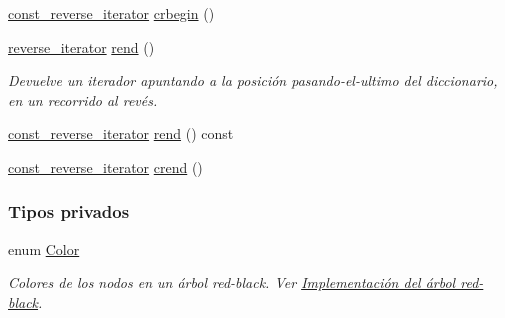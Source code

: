 \begin{Indent}
\begin{DoxyCompactItemize}
\item 
\hyperlink{classaed2_1_1map_aed66a216549d13078a3ea6978ea0b768_aed66a216549d13078a3ea6978ea0b768}{const\+\_\+reverse\+\_\+iterator} \hyperlink{classaed2_1_1map_a6ad62765a2b2e00247b9e35a7542b448_a6ad62765a2b2e00247b9e35a7542b448}{crbegin} ()
\item 
\hyperlink{classaed2_1_1map_a8e6a592062260177fd73b2f9897b1dd5_a8e6a592062260177fd73b2f9897b1dd5}{reverse\+\_\+iterator} \hyperlink{classaed2_1_1map_a277f03b4f4b6b98879e4e4921081801f_a277f03b4f4b6b98879e4e4921081801f}{rend} ()
\begin{DoxyCompactList}\small\item\em Devuelve un iterador apuntando a la posición pasando-\/el-\/ultimo del diccionario, en un recorrido al revés. \end{DoxyCompactList}\item 
\hyperlink{classaed2_1_1map_aed66a216549d13078a3ea6978ea0b768_aed66a216549d13078a3ea6978ea0b768}{const\+\_\+reverse\+\_\+iterator} \hyperlink{classaed2_1_1map_a7cf14a4b505505d0f074034b7399fb24_a7cf14a4b505505d0f074034b7399fb24}{rend} () const
\item 
\hyperlink{classaed2_1_1map_aed66a216549d13078a3ea6978ea0b768_aed66a216549d13078a3ea6978ea0b768}{const\+\_\+reverse\+\_\+iterator} \hyperlink{classaed2_1_1map_a40933b2efe1cb479de9195ea947244d1_a40933b2efe1cb479de9195ea947244d1}{crend} ()
\end{DoxyCompactItemize}
\end{Indent}
\subsubsection*{Tipos privados}
\begin{DoxyCompactItemize}
\item 
enum \hyperlink{classaed2_1_1map_a6d62a415a4b9d320b30cada4ebcf9f5b_a6d62a415a4b9d320b30cada4ebcf9f5b}{Color} \begin{DoxyCompactList}\small\item\em Colores de los nodos en un árbol red-\/black. Ver \hyperlink{Implementacion}{Implementación del árbol red-\/black}. \end{DoxyCompactList}
\end{DoxyCompactItemize}
